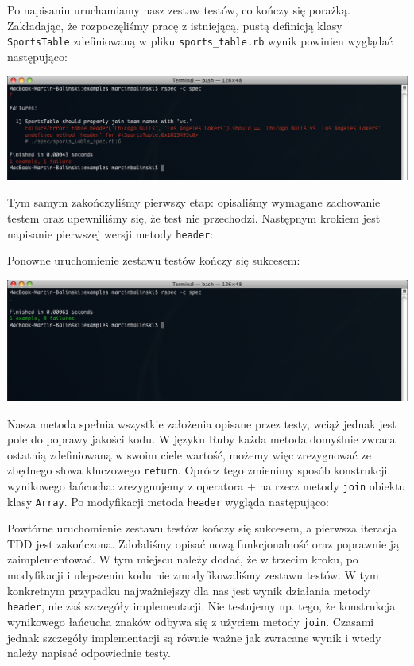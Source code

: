     Po napisaniu uruchamiamy nasz zestaw testów, co kończy się porażką. Zakładając, że rozpoczęliśmy pracę z istniejącą, pustą definicją klasy \verb+SportsTable+ zdefiniowaną w pliku \verb+sports_table.rb+ wynik powinien wyglądać następująco:

    \includegraphics[width=160mm]{images/example1_failure.png}
    
    Tym samym zakończyliśmy pierwszy etap: opisaliśmy wymagane zachowanie testem oraz upewniliśmy się, że test nie przechodzi. Następnym krokiem jest napisanie pierwszej wersji metody \verb+header+:
    
    
    
    Ponowne uruchomienie zestawu testów kończy się sukcesem:
    
    \includegraphics[width=160mm]{images/example1_success.png}
    
    Nasza metoda spełnia wszystkie założenia opisane przez testy, wciąż jednak jest pole do poprawy jakości kodu. W języku Ruby każda metoda domyślnie zwraca ostatnią zdefiniowaną w swoim ciele wartość, możemy więc zrezygnować ze zbędnego słowa kluczowego \verb+return+. Oprócz tego zmienimy sposób konstrukcji wynikowego łańcucha: zrezygnujemy z operatora \verb+++ na rzecz metody \verb+join+ obiektu klasy \verb+Array+. Po modyfikacji metoda \verb+header+ wygląda następująco:
    
    
    
  Powtórne uruchomienie zestawu testów kończy się sukcesem, a pierwsza iteracja TDD jest zakończona. Zdołaliśmy opisać nową funkcjonalność oraz poprawnie ją zaimplementować. W tym miejscu należy dodać, że w trzecim kroku, po modyfikacji i ulepszeniu kodu nie zmodyfikowaliśmy zestawu testów. W tym konkretnym przypadku najważniejszy dla nas jest wynik działania metody \verb+header+, nie zaś szczegóły implementacji. Nie testujemy np. tego, że konstrukcja wynikowego łańcucha znaków odbywa się z użyciem metody \verb+join+. Czasami jednak szczegóły implementacji są równie ważne jak zwracane wynik i wtedy należy napisać odpowiednie testy.
    
